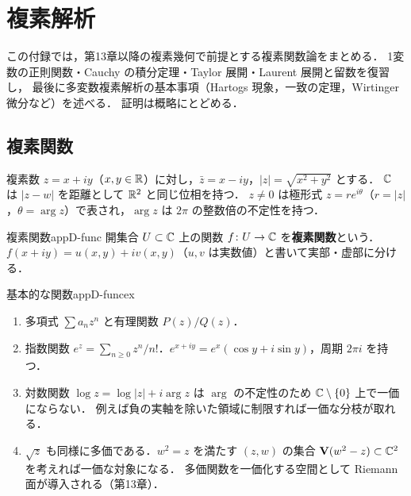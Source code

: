 \chapter{複素解析}\label{app:D}

この付録では，第13章以降の複素幾何で前提とする複素関数論をまとめる．
1変数の正則関数・Cauchy の積分定理・Taylor 展開・Laurent 展開と留数を復習し，
最後に多変数複素解析の基本事項（Hartogs 現象，一致の定理，Wirtinger 微分など）を述べる．
証明は概略にとどめる．

\section{複素関数}

複素数 $z=x+iy$（$x,y\in\mathbb{R}$）に対し，$\bar z=x-iy$，$|z|=\sqrt{x^2+y^2}$ とする．
$\mathbb{C}$ は $|z-w|$ を距離として $\mathbb{R}^2$ と同じ位相を持つ．
$z\ne0$ は極形式 $z=re^{i\theta}$（$r=|z|$，$\theta=\arg z$）で表され，$\arg z$ は $2\pi$ の整数倍の不定性を持つ．

\begin{mydef}{複素関数}{appD-func}
開集合 $U\subset\mathbb{C}$ 上の関数 $f\colon U\to\mathbb{C}$ を\textbf{複素関数}という．
$f(x+iy)=u(x,y)+iv(x,y)$（$u,v$ は実数値）と書いて実部・虚部に分ける．
\end{mydef}

\begin{myex}{基本的な関数}{appD-funcex}
\begin{enumerate}
\item 多項式 $\sum a_nz^n$ と有理関数 $P(z)/Q(z)$．
\item 指数関数 $e^z=\sum_{n\geq0}z^n/n!$．$e^{x+iy}=e^x(\cos y+i\sin y)$，周期 $2\pi i$ を持つ．
\item 対数関数 $\log z=\log|z|+i\arg z$ は $\arg$ の不定性のため $\mathbb{C}\setminus\{0\}$ 上で一価にならない．
例えば負の実軸を除いた領域に制限すれば一価な分枝が取れる．
\item $\sqrt z$ も同様に多価である．$w^2=z$ を満たす $(z,w)$ の集合 $\mathbf{V}(w^2-z)\subset\mathbb{C}^2$ を考えれば一価な対象になる．
多価関数を一価化する空間として Riemann 面が導入される（第13章）．
\end{enumerate}
\end{myex}

